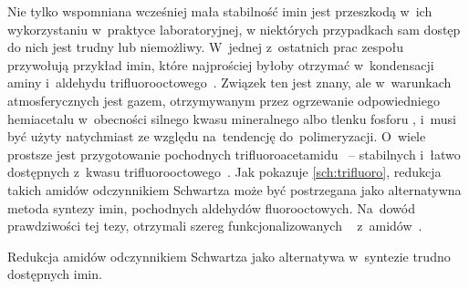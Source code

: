 Nie tylko wspomniana wcześniej mała stabilność imin jest przeszkodą w~ich wykorzystaniu w~praktyce
  laboratoryjnej, w niektórych przypadkach sam dostęp do nich jest trudny lub niemożliwy.
W~jednej z~ostatnich prac zespołu \citeauthor{czerwinski19} przywołują
  przykład imin, które najprościej byłoby otrzymać w~kondensacji aminy i~aldehydu
  trifluorooctowego~.
Związek ten jest znany, ale w~warunkach atmosferycznych jest gazem, otrzymywanym przez ogrzewanie
  odpowiedniego hemiacetalu  w~obecności silnego kwasu mineralnego albo
  tlenku fosforu , i~musi być użyty natychmiast ze względu na~tendencję do~polimeryzacji.
O~wiele prostsze jest przygotowanie pochodnych trifluoroacetamidu~ \---
  stabilnych i~łatwo dostępnych z~kwasu trifluorooctowego~.
Jak pokazuje \cref{sch:trifluoro}, redukcja takich amidów odczynnikiem Schwartza może być
  postrzegana jako alternatywna metoda syntezy imin, pochodnych aldehydów fluorooctowych.
Na~dowód prawdziwości tej tezy, \citeauthor{czerwinski19} otrzymali szereg funkcjonalizowanych
  ~ z~amidów~.
\begin{scheme*}
  
  \caption{
    Redukcja amidów odczynnikiem Schwartza jako alternatywa w~syntezie trudno dostępnych imin.
  }
  \label{sch:trifluoro}
\end{scheme*}
